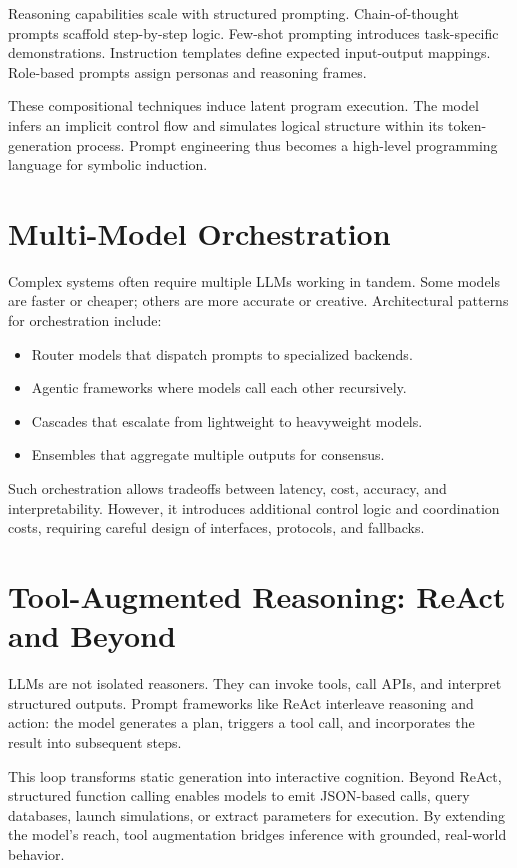 \documentclass{book}
\begin{document}
Reasoning capabilities scale with structured prompting. Chain-of-thought prompts scaffold step-by-step logic. Few-shot prompting introduces task-specific demonstrations. Instruction templates define expected input-output mappings. Role-based prompts assign personas and reasoning frames.

These compositional techniques induce latent program execution. The model infers an implicit control flow and simulates logical structure within its token-generation process. Prompt engineering thus becomes a high-level programming language for symbolic induction.

\section{Multi-Model Orchestration}

Complex systems often require multiple LLMs working in tandem. Some models are faster or cheaper; others are more accurate or creative. Architectural patterns for orchestration include:

\begin{itemize}
  \item Router models that dispatch prompts to specialized backends.
  \item Agentic frameworks where models call each other recursively.
  \item Cascades that escalate from lightweight to heavyweight models.
  \item Ensembles that aggregate multiple outputs for consensus.
\end{itemize}

Such orchestration allows tradeoffs between latency, cost, accuracy, and interpretability. However, it introduces additional control logic and coordination costs, requiring careful design of interfaces, protocols, and fallbacks.

\section{Tool-Augmented Reasoning: ReAct and Beyond}

LLMs are not isolated reasoners. They can invoke tools, call APIs, and interpret structured outputs. Prompt frameworks like ReAct interleave reasoning and action: the model generates a plan, triggers a tool call, and incorporates the result into subsequent steps.

This loop transforms static generation into interactive cognition. Beyond ReAct, structured function calling enables models to emit JSON-based calls, query databases, launch simulations, or extract parameters for execution. By extending the model’s reach, tool augmentation bridges inference with grounded, real-world behavior.
\end{document}
